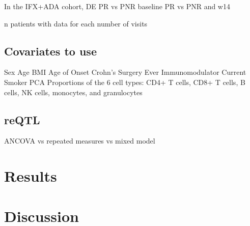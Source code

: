 In the IFX+ADA cohort, 
    DE
    PR vs PNR baseline
    PR vs PNR and w14

n patients with data for each number of visits

\subsection{Covariates to use}

Sex
Age
BMI
Age of Onset
Crohn’s Surgery
Ever Immunomodulator
Current Smoker
PCA
Proportions of the 6 cell types: CD4+ T cells, CD8+ T cells, B cells, NK cells, monocytes, and granulocytes

\subsection{reQTL}



ANCOVA vs repeated measures vs mixed model


\section{Results}

\section{Discussion}

